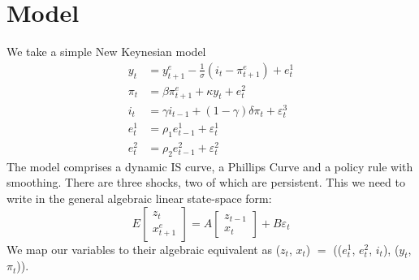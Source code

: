 \documentclass[
  letterpaper,
]{book}
\begin{document}
\hypertarget{model}{%
\section{Model}\label{model}}

We take a simple New Keynesian model \begin{align}
y_t    &= y_{t+1}^e-\frac{1}{\sigma} (i_t - \pi_{t+1}^e) + e_t^1 \\
\pi_t  &= \beta \pi_{t+1}^e + \kappa y_t + e_t^2 \\
i_t    &= \gamma i_{t-1} + (1-\gamma) \delta \pi_t + \varepsilon_t^3 \\ 
e_t^1  &= \rho_1 e_{t-1}^1 + \varepsilon_t^1 \\ 
e_t^2  &= \rho_2 e_{t-1}^2 + \varepsilon_t^2 
\end{align} The model comprises a dynamic IS curve, a Phillips Curve and
a policy rule with smoothing. There are three shocks, two of which are
persistent. This we need to write in the general algebraic linear
state-space form: \[
E\begin{bmatrix} z_t \\ x_{t+1}^e \end{bmatrix} = A \begin{bmatrix} z_{t-1} \\ x_t \end{bmatrix} + B \varepsilon_t  
\] We map our variables to their algebraic equivalent as (\(z_t\),
\(x_t\)) \(=\) ((\(e^1_t\), \(e^2_t\), \(i_t\)), (\(y_t\), \(\pi_t\))).
\end{document}
